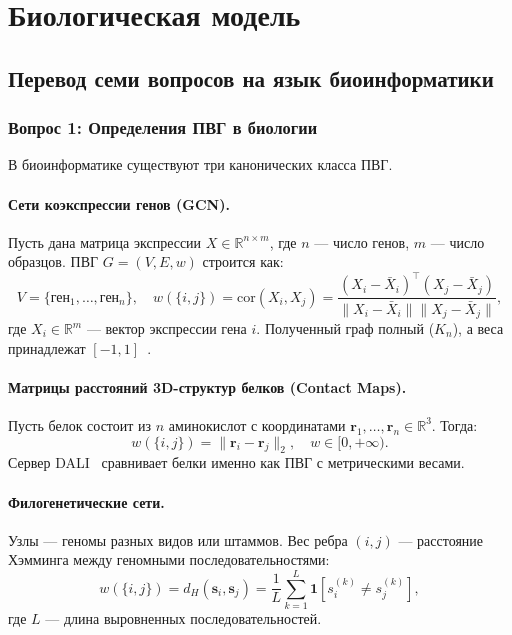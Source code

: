 
\section{Биологическая модель}
\label{sec:biomodel}

\subsection{Перевод семи вопросов на язык биоинформатики}

\subsubsection{Вопрос 1: Определения ПВГ в биологии}

В биоинформатике существуют три канонических класса ПВГ.

\paragraph{Сети коэкспрессии генов (GCN).}
Пусть дана матрица экспрессии $X \in \mathbb{R}^{n \times m}$,
где $n$ — число генов, $m$ — число образцов.
ПВГ $G = (V, E, w)$ строится как:
\[
    V = \{\text{ген}_1, \ldots, \text{ген}_n\},
    \quad
    w(\{i, j\}) = \mathrm{cor}(X_i, X_j)
    = \frac{(X_i - \bar{X}_i)^\top (X_j - \bar{X}_j)}
           {\|X_i - \bar{X}_i\| \|X_j - \bar{X}_j\|},
\]
где $X_i \in \mathbb{R}^m$ — вектор экспрессии гена $i$.
Полученный граф полный ($K_n$), а веса принадлежат $[-1, 1]$~\cite{wgcna2008}.

\paragraph{Матрицы расстояний 3D-структур белков (Contact Maps).}
Пусть белок состоит из $n$ аминокислот с координатами $\mathbf{r}_1, \ldots, \mathbf{r}_n \in \mathbb{R}^3$.
Тогда:
\[
    w(\{i, j\}) = \|\mathbf{r}_i - \mathbf{r}_j\|_2, \quad w \in [0, +\infty).
\]
Сервер DALI~\cite{dali1993} сравнивает белки именно как ПВГ с метрическими весами.

\paragraph{Филогенетические сети.}
Узлы — геномы разных видов или штаммов.
Вес ребра $(i,j)$ — расстояние Хэмминга между геномными последовательностями:
\[
    w(\{i, j\}) = d_H(\mathbf{s}_i, \mathbf{s}_j)
    = \frac{1}{L}\sum_{k=1}^{L} \mathbf{1}[s_i^{(k)} \ne s_j^{(k)}],
\]
где $L$ — длина выровненных последовательностей.

